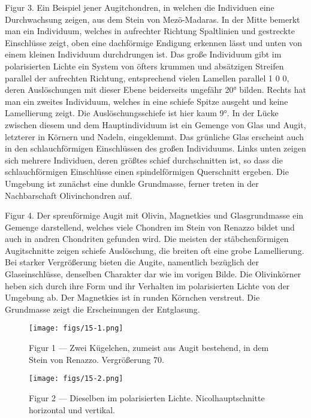 \documentclass[a4paper, 11pt, oneside, polutonikogreek, german]{article}
\begin{document}
Figur 3. Ein Beispiel jener Augitchondren, in welchen die Individuen eine Durchwachsung zeigen, aus dem Stein von Mezö-Madaras. In der Mitte bemerkt man ein Individuum, welches in aufrechter Richtung Spaltlinien und gestreckte Einschlüsse zeigt, oben eine dachförmige Endigung erkennen lässt und unten von einem kleinen Individuum durchdrungen ist. Das große Individuum gibt im polarisierten Lichte ein System von öfters krummen und absätzigen Streifen parallel der aufrechten Richtung, entsprechend vielen Lamellen parallel 1 0 0, deren Auslöschungen mit dieser Ebene beiderseits ungefähr 20° bilden. Rechts hat man ein zweites Individuum, welches in eine schiefe Spitze ausgeht und keine Lamellierung zeigt. Die Auslöschungsschiefe ist hier kaum 9°. In der Lücke zwischen diesem und dem Hauptindividuum ist ein Gemenge von Glas und Augit, letzterer in Körnern und Nadeln, eingeklemmt. Das grünliche Glas erscheint auch in den schlauchförmigen Einschlüssen des großen Individuums. Links unten zeigen sich mehrere Individuen, deren größtes schief durchschnitten ist, so dass die schlauchförmigen Einschlüsse einen spindelförmigen Querschnitt ergeben. Die Umgebung ist zunächst eine dunkle Grundmasse, ferner treten in der Nachbarschaft Olivinchondren auf.

Figur 4. Der spreuförmige Augit mit Olivin, Magnetkies und Glasgrundmasse ein Gemenge darstellend, welches viele Chondren im Stein von Renazzo bildet und auch in andren Chondriten gefunden wird. Die meisten der stäbchenförmigen Augitschnitte zeigen schiefe Auslöschung, die breiten oft eine grobe Lamellierung. Bei starker Vergrößerung bieten die Augite, namentlich bezüglich der Glaseinschlüsse, denselben Charakter dar wie im vorigen Bilde. Die Olivinkörner heben sich durch ihre Form und ihr Verhalten im polarisierten Lichte von der Umgebung ab. Der Magnetkies ist in runden Körnchen verstreut. Die Grundmasse zeigt die Erscheinungen der Entglasung.
\clearpage

\vspace*{\fill}
\begin{figure}[H]
\centering
\texttt{[image: figs/15-1.png]}
\caption{\small Figur 1 --- Zwei Kügelchen, zumeist aus Augit bestehend, in dem Stein von Renazzo. Vergrößerung 70.}
\end{figure}
\vspace*{\fill}
\clearpage

\vspace*{\fill}
\begin{figure}[H]
\centering
\texttt{[image: figs/15-2.png]}
\caption{\small Figur 2 --- Dieselben im polarisierten Lichte. Nicolhauptschnitte horizontal und vertikal.}
\end{figure}
\vspace*{\fill}
\clearpage
\end{document}
